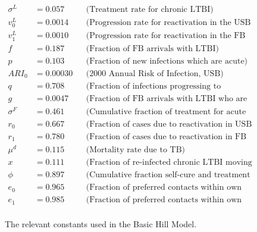 \documentclass{amsart}
\begin{document}
\begin{figure}
  \begin{align*}
    \sigma^{L} &= 0.057   &&\text{(Treatment rate for chronic LTBI)}\\
    v^{L}_{0}  &= 0.0014  &&\text{(Progression rate for reactivation in the USB
                                   population)}\\
    v^{L}_{1}  &= 0.0010  &&\text{(Progression rate for reactivation in the FB
                                   population)}\\
    f          &= 0.187   &&\text{(Fraction of FB arrivals with LTBI)}\\
    p          &= 0.103   &&\text{(Fraction of new infections which are acute)}\\
    ARI_{0}    &= 0.00030 &&\text{(2000 Annual Risk of Infection, USB)}\\
    q          &= 0.708   &&\text{(Fraction of infections progressing to infectious
                                   disease)}\\
    g          &= 0.0047  &&\text{(Fraction of FB arrivals with LTBI who are fast
                                   progressors)}\\
    \sigma^{F} &= 0.461   &&\text{(Cumulative fraction of treatment for acute
                                   infection)}\\
    r_{0}      &= 0.667   &&\text{(Fraction of cases due to reactivation in USB
                                   population)}\\
    r_{1}      &= 0.780   &&\text{(Fraction of cases due to reactivation in FB
                                   population)}\\
    \mu^{d}    &= 0.115   &&\text{(Mortality rate due to TB)}\\
    x          &= 0.111   &&\text{(Fraction of re-infected chronic LTBI moving to
                                   acute infection)}\\
    \phi       &= 0.897   &&\text{(Cumulative fraction self-cure and treatment of
                                   active disease)}\\
    e_{0}      &= 0.965   &&\text{(Fraction of preferred contacts within own
                                   population for USB)}\\
    e_{1}      &= 0.985   &&\text{(Fraction of preferred contacts within own
                                  population for FB)}\\
  \end{align*}
  \caption{The relevant constants used in the Basic Hill Model.  }
  \label{fig:basicHillConstants}
\end{figure}
\end{document}
